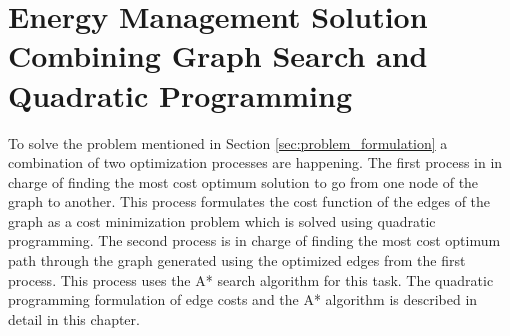 \section{Energy Management Solution Combining Graph Search and Quadratic Programming}
To solve the problem mentioned in Section \ref{sec:problem_formulation} a combination of two optimization processes are happening. The first process in in charge of finding the most cost optimum solution to go from one node of the graph to another. This process formulates the cost function of the edges of the graph as a cost minimization problem which is solved using quadratic programming. The second process is in charge of finding the most cost optimum path through the graph generated using the optimized edges from the first process. This process uses the A* search algorithm for this task. The quadratic programming formulation of edge costs and the A* algorithm is described in detail in this chapter.



